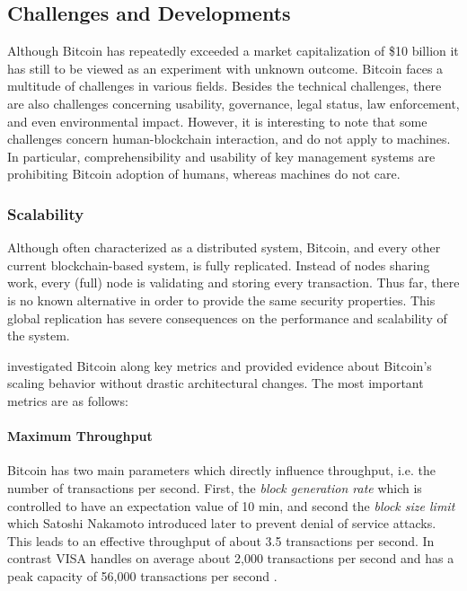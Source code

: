 \subsection{Challenges and Developments}
\label{sec:btc_challenges}

Although Bitcoin has repeatedly exceeded a market capitalization of \$10 billion it has still to be viewed as an experiment with unknown outcome. Bitcoin faces a multitude of challenges in various fields. Besides the technical challenges, there are also challenges concerning usability, governance, legal status, law enforcement, and even environmental impact. However, it is interesting to note that some challenges concern human-blockchain interaction, and do not apply to machines. In particular, comprehensibility and usability of key management systems are prohibiting Bitcoin adoption of humans, whereas machines do not care.

\subsubsection{Scalability}
\label{sec:btc_scalability}

Although often characterized as a distributed system, Bitcoin, and every other current blockchain-based system, is fully replicated. Instead of nodes sharing work, every (full) node is validating and storing every transaction. Thus far, there is no known alternative in order to provide the same security properties. This global replication has severe consequences on the performance and scalability of the system.

\cite{croman2016scaling} investigated Bitcoin along key metrics and provided evidence about Bitcoin's scaling behavior without drastic architectural changes.
The most important metrics are as follows:
\paragraph{Maximum Throughput} 
Bitcoin has two main parameters which directly influence throughput, i.e. the number of transactions per second. First, the \emph{block generation rate} which is controlled to have an expectation value of 10 min, and second the \emph{block size limit} which Satoshi Nakamoto introduced later to prevent denial of service attacks. This leads to an effective throughput of about 3.5 transactions per second. In contrast VISA handles on average about 2,000 transactions per second and has a peak capacity of 56,000 transactions per second \parencite{visa}. 
